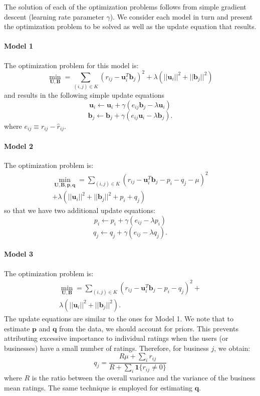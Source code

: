 \documentclass[12pt]{article}
\newcommand{\mbf}[1]{\mathbf{#1}}
\begin{document}
The solution of each of the optimization problems follows from simple gradient descent (learning rate parameter $\gamma$). We consider each model in turn and present the optimization problem to be solved as well as the update equation that results.

\paragraph{Model 1} The optimization problem for this model is:
\begin{equation*}
\min_{\mbf U,\mbf B} = \sum_{(i,j)\in K} (r_{ij}-\mbf u_i^T\mbf b_j)^2+\lambda\left(||\mbf u_i||^2+||\mbf b_j||^2\right)
\end{equation*}
and results in the following simple update equations
\begin{equation*}
\mbf u_i \leftarrow \mbf u_i+\gamma\left(e_{ij}\mbf b_j-\lambda\mbf u_i\right)
\end{equation*}
\begin{equation*}
\mbf b_j \leftarrow \mbf b_j+\gamma\left(e_{ij}\mbf u_i-\lambda\mbf b_j\right).
\end{equation*}
where $e_{ij}\equiv r_{ij}-\hat r_{ij}$.

\paragraph{Model 2} The optimization problem is:
\begin{multline*}
\min_{\mbf U,\mbf B,\mbf p,\mbf q} = \sum_{(i,j)\in K} (r_{ij}-\mbf u_i^T\mbf b_j-p_i-q_j-\mu)^2\\
+\lambda\left(||\mbf u_i||^2+||\mbf b_j||^2+p_i+q_j\right)
\end{multline*}
so that we have two additional update equations:
\begin{equation*}
p_i\leftarrow p_i+\gamma\left(e_{ij}-\lambda p_i\right)
\end{equation*}
\begin{equation*}
q_j\leftarrow q_j+\gamma\left(e_{ij}-\lambda q_j\right).
\end{equation*}

\paragraph{Model 3} The optimization problem is:
\begin{multline*}
\min_{\mbf U,\mbf B} = \sum_{(i,j)\in K} (r_{ij}-\mbf u_i^T\mbf b_j-p_i-q_j)^2+\\
\lambda\left(||\mbf u_i||^2+||\mbf b_j||^2\right).
\end{multline*}
The update equations are similar to the ones for Model 1. We note that to estimate $\mbf p$ and $\mbf q$ from the data, we should account for priors. This prevents attributing excessive importance to individual ratings when the users (or businesses) have a small number of ratings. Therefore, for business $j$, we obtain:
\begin{equation*}
q_j = \frac{R \mu+\sum_i r_{ij}}{R+\sum_i\mbf 1\{r_{ij}\neq 0\}}
\end{equation*}
where $R$ is the ratio between the overall variance and the variance of the business mean ratings. The same technique is employed for estimating $\mbf q$.
\end{document}
